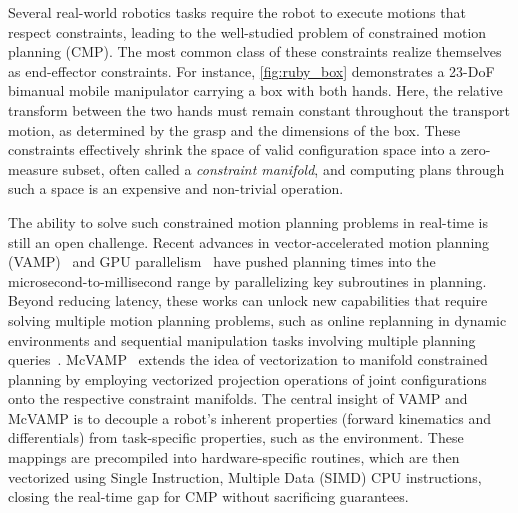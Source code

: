 \documentclass[letterpaper, 10 pt, conference]{ieeeconf}
\begin{document}
Several real-world robotics tasks require the robot to execute motions that respect constraints, leading to the well-studied problem of constrained motion planning (CMP). The most common class of these constraints realize themselves as end-effector constraints. For instance, \cref{fig:ruby_box} demonstrates a 23-DoF bimanual mobile manipulator carrying a box with both hands. Here, the relative transform between the two hands must remain constant throughout the transport motion, as determined by the grasp and the dimensions of the box. These constraints effectively shrink the space of valid configuration space into a zero-measure subset, often called a \emph{constraint manifold}, and computing plans through such a space is an expensive and non-trivial operation.


The ability to solve such constrained motion planning problems in real-time is still an open challenge.
Recent advances in vector-accelerated motion planning (VAMP)~\cite{vamp} and GPU parallelism~\cite{sundaralingam2023curobo1} have pushed planning times into the microsecond-to-millisecond range by parallelizing key subroutines in planning. Beyond reducing latency, these works can unlock new capabilities that require solving multiple motion planning problems, such as online replanning in dynamic environments and sequential manipulation tasks involving multiple planning queries~\cite{shen2024differentiable}. 
McVAMP~\cite{iyer2026vectorizing} extends the idea of vectorization to manifold constrained planning by employing vectorized projection operations of joint configurations onto the respective constraint manifolds. 
The central insight of VAMP and McVAMP is to decouple a robot's inherent properties (forward kinematics and differentials) from task-specific properties, such as the environment. These mappings are precompiled into hardware-specific routines, which are then vectorized using Single Instruction, Multiple Data (SIMD) CPU instructions, closing the real-time gap for CMP without sacrificing guarantees. 
\end{document}
